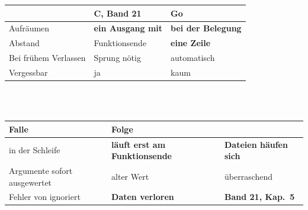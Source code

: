 \begin{merksatz}
\begin{center}
\renewcommand{\arraystretch}{1.5}
\begin{tabular}{@{}P{2.4cm}P{2.8cm}P{3.2cm}@{}}
\toprule
& \textbf{C, Band 21} & \textbf{Go}\\
\midrule
Aufräumen & \textbf{ein Ausgang mit } & \textbf{ bei der Belegung}\\
Abstand & \textcolor{akzent}{Funktionsende} & \textcolor{gruen}{\textbf{eine Zeile}}\\
Bei frühem Verlassen & \textcolor{mittel}{Sprung nötig} & \textcolor{gruen}{automatisch}\\
Vergessbar & \textcolor{akzent}{ja} & \textcolor{gruen}{kaum}\\
\bottomrule
\end{tabular}
\end{center}

\begin{center}
\begin{minipage}{0.88\textwidth}
\end{minipage}
\end{center}

\begin{center}
\begin{minipage}{0.9\textwidth}
\\
\\
\end{minipage}
\end{center}

\begin{warnung}
\begin{center}
{\small
\renewcommand{\arraystretch}{1.5}
\begin{tabular}{@{}P{3.0cm}P{2.6cm}P{2.6cm}@{}}
\toprule
\textbf{Falle} & \textbf{Folge} & \\
\midrule
{} in der Schleife & \textcolor{akzent}{\textbf{läuft erst am Funktionsende}} & \textbf{Dateien häufen sich}\\
Argumente sofort ausgewertet & \textcolor{akzent}{alter Wert} & \textcolor{akzent}{überraschend}\\
Fehler von  ignoriert & \textcolor{akzent}{\textbf{Daten verloren}} & \textbf{Band 21, Kap.~5}\\
\bottomrule
\end{tabular}}
\end{center}


\end{warnung}
\end{merksatz}
